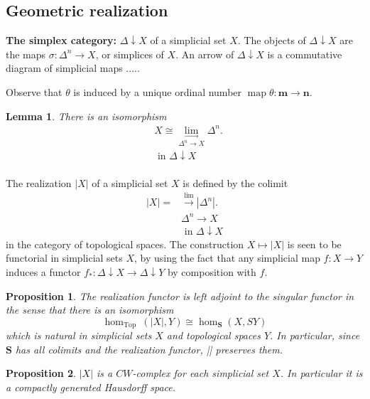 \documentclass{book}
\newtheorem{prop}{Proposition}
\newtheorem{lemm}{Lemma}
\begin{document}
\subsection*{Geometric realization}

\textbf{The simplex category:} $\Delta \downarrow X$ of a simplicial set $X$. The objects of $\Delta \downarrow X$ are the maps $\sigma: \Delta^n \rightarrow X$, or simplices of $X$. An arrow of $\Delta \downarrow X$ is a commutative diagram of simplicial maps .....

Observe that $\theta$ is induced by a unique ordinal number $\operatorname{map} \theta: \mathbf{m} \rightarrow \mathbf{n}$.
\begin{lemm} There is an isomorphism
$$
\begin{aligned}
& X \cong \underset{\Delta^n \longrightarrow X}{\lim _{\longrightarrow}} \Delta^n . \\
& \text { in } \Delta \downarrow X \\
&
\end{aligned}
$$
\end{lemm}

The realization $|X|$ of a simplicial set $X$ is defined by the colimit
$$
\begin{aligned}
|X|= & \xrightarrow{\lim }\left|\Delta^n\right| . \\
& \Delta^n \rightarrow X \\
& \text { in } \Delta \downarrow X
\end{aligned}
$$
in the category of topological spaces. The construction $X \mapsto|X|$ is seen to be functorial in simplicial sets $X$, by using the fact that any simplicial map $f: X \rightarrow Y$ induces a functor $f_*: \Delta \downarrow X \rightarrow \Delta \downarrow Y$ by composition with $f$.

\begin{prop}
    The realization functor is left adjoint to the singular functor in the sense that there is an isomorphism
$$
\operatorname{hom}_{\text {Top }}(|X|, Y) \cong \operatorname{hom}_{\mathbf{S}}(X, S Y)
$$
which is natural in simplicial sets $X$ and topological spaces $Y$. In particular, since $\mathbf{S}$ has all colimits and the realization functor, || preserves them.
\end{prop} 

\begin{prop}
    $|X|$ is a $C W$-complex for each simplicial set $X$. In particular it is a compactly generated Hausdorff space.
\end{prop}
\end{document}
